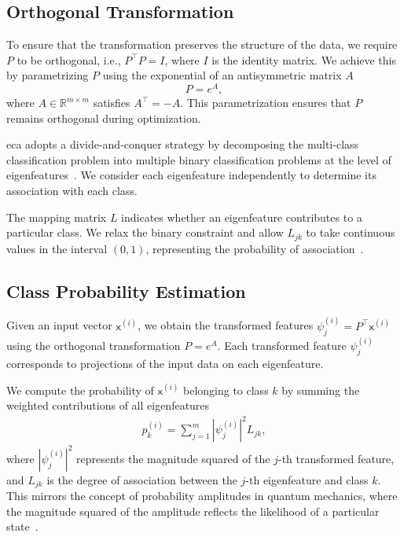 \documentclass[lettersize,journal]{IEEEtran}
\begin{document}
\subsection{Orthogonal Transformation}

To ensure that the transformation preserves the structure of the data, we require \( P \) to be orthogonal, i.e., \( P^\top P = I \), where \( I \) is the identity matrix. We achieve this by parametrizing \( P \) using the exponential of an antisymmetric matrix \( A \)~\cite{absil2008optimization}
\begin{equation}
P = e^{A},
\end{equation}
where \( A \in \mathbb{R}^{m \times m} \) satisfies \( A^\top = -A \). This parametrization ensures that \( P \) remains orthogonal during optimization.

\Gls{eca} adopts a divide-and-conquer strategy by decomposing the multi-class classification problem into multiple binary classification problems at the level of eigenfeatures~\cite{dietterich2000ensemble}. We consider each eigenfeature independently to determine its association with each class.

The mapping matrix \( L \) indicates whether an eigenfeature contributes to a particular class. We relax the binary constraint and allow \( L_{jk} \) to take continuous values in the interval \( (0,1) \), representing the probability of association~\cite{liu2011defense}.

\subsection{Class Probability Estimation}

Given an input vector \( \mathsf{x}^{(i)} \), we obtain the transformed features \( \psi_j^{(i)} = P^\top \mathsf{x}^{(i)} \) using the orthogonal transformation \( P = e^A \). Each transformed feature \( \psi_j^{(i)} \) corresponds to projections of the input data on each eigenfeature.

We compute the probability of \( \mathsf{x}^{(i)} \) belonging to class \( k \) by summing the weighted contributions of all eigenfeatures
\begin{align}
    p_k^{(i)} = \sum_{j=1}^m |\psi_j^{(i)}|^2 L_{jk},
    \label{eq:map_matrix}
\end{align}
where \( |\psi_j^{(i)}|^2 \) represents the magnitude squared of the \( j \)-th transformed feature, and \( L_{jk} \) is the degree of association between the \( j \)-th eigenfeature and class \( k \). This mirrors the concept of probability amplitudes in quantum mechanics, where the magnitude squared of the amplitude reflects the likelihood of a particular state~\cite{nielsen2010quantum}.
\end{document}
